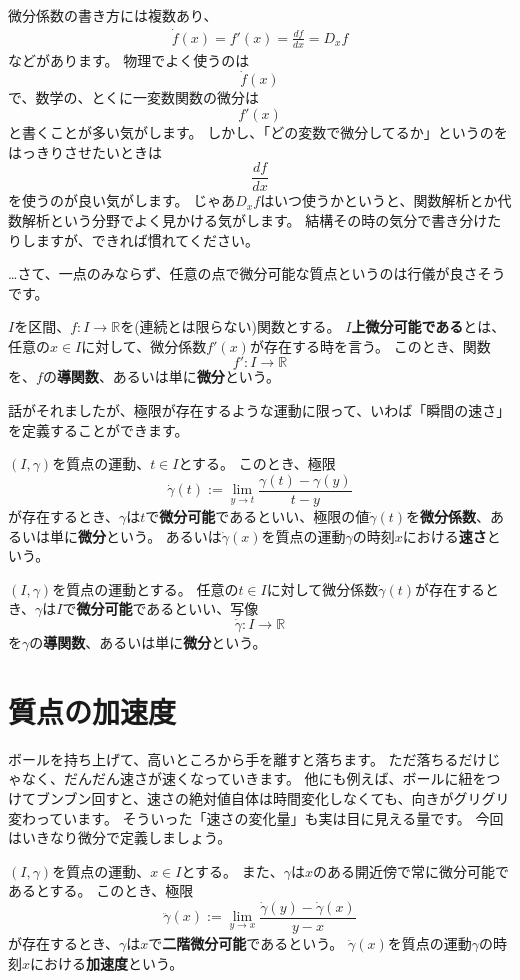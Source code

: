 微分係数の書き方には複数あり、
\begin{align*}
  \dot{f}(x)=f'(x)=\frac{df}{dx}=D_xf
\end{align*}
などがあります。
物理でよく使うのは
\[
  \dot{f}(x)
\]
で、数学の、とくに一変数関数の微分は
\[
  f'(x)
\]
と書くことが多い気がします。
しかし、「どの変数で微分してるか」というのをはっきりさせたいときは
\[
  \frac{df}{dx}
\]
を使うのが良い気がします。
じゃあ$D_xf$はいつ使うかというと、関数解析とか代数解析という分野でよく見かける気がします。
結構その時の気分で書き分けたりしますが、できれば慣れてください。

…さて、一点のみならず、任意の点で微分可能な質点というのは行儀が良さそうです。
\begin{definition}
  $I$を区間、$f:I\to\mathbb{R}$を(連続とは限らない)関数とする。
  \textbf{$I$上微分可能である}とは、任意の$x\in I$に対して、微分係数$f'(x)$が存在する時を言う。
  このとき、関数
  \[
    f':I\to\mathbb{R}
  \]
  を、$f$の\textbf{導関数}、あるいは単に\textbf{微分}という。
\end{definition}

話がそれましたが、極限が存在するような運動に限って、いわば「瞬間の速さ」を定義することができます。
\begin{definition}
  $(I,\gamma)$を質点の運動、$t\in I$とする。
  このとき、極限
  \[
    \dot\gamma(t):=\lim_{y\to t}\frac{\gamma(t)-\gamma(y)}{t-y}
  \]
  が存在するとき、$\gamma$は$t$で\textbf{微分可能}であるといい、極限の値$\dot\gamma(t)$を\textbf{微分係数}、あるいは単に\textbf{微分}という。
  あるいは$\dot\gamma(x)$を質点の運動$\gamma$の時刻$x$における\textbf{速さ}という。
\end{definition}

\begin{definition}
  $(I,\gamma)$を質点の運動とする。
  任意の$t\in I$に対して微分係数$\dot\gamma(t)$が存在するとき、$\gamma$は$I$で\textbf{微分可能}であるといい、写像
  \[
    \dot\gamma:I\to\mathbb{R}
  \]
  を$\gamma$の\textbf{導関数}、あるいは単に\textbf{微分}という。
\end{definition}



\section{質点の加速度}

ボールを持ち上げて、高いところから手を離すと落ちます。
ただ落ちるだけじゃなく、だんだん速さが速くなっていきます。
他にも例えば、ボールに紐をつけてブンブン回すと、速さの絶対値自体は時間変化しなくても、向きがグリグリ変わっています。
そういった「速さの変化量」も実は目に見える量です。
今回はいきなり微分で定義しましょう。
\begin{definition}
  $(I,\gamma)$を質点の運動、$x\in I$とする。
  また、$\gamma$は$x$のある開近傍で常に微分可能であるとする。
  このとき、極限
  \[
    \ddot\gamma(x):=\lim_{y\to x}\frac{\dot\gamma(y)-\dot\gamma(x)}{y-x}
  \]
  が存在するとき、$\gamma$は$x$で\textbf{二階微分可能}であるという。
  $\ddot\gamma(x)$を質点の運動$\gamma$の時刻$x$における\textbf{加速度}という。
\end{definition}

